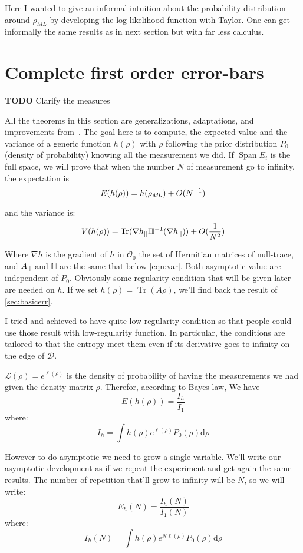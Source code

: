 \documentclass[10pt]{report}
\theoremstyle{plain}
\theoremstyle{definition}
\theoremstyle{remark}
\newcommand{\TODO}{\textbf{TODO}}
\newcommand{\dd}{\mathrm{d}}
\DeclareMathOperator{\Tr}{Tr}
\DeclareMathOperator{\Span}{Span}
\newcommand{\ml}{_{M\!L}}
\begin{document}
Here I wanted to give an informal intuition about the probability distribution
around $\rho\ml$ by developing the log-likelihood function with Taylor. One can
get informally the same results as in next section but with far less calculus.

\section{Complete first order error-bars}\label{sec:errbar}

\TODO{} Clarify the measures

All the theorems in this section are generalizations,
adaptations, and improvements from~\cite{SPRAL17}. The goal here is to compute,
the expected value and the variance of a generic function $h(\rho)$
with $\rho$ following the prior distribution $P_0$
(density of probability) knowing all the measurement
we did. If $\Span E_i$ is the full space,
we will prove that when the number $N$ of measurement go to infinity, the
expectation is
\[E(h(\rho)) = h(\rho\ml) + O(N\inv)\]

and the variance is:
\[V(h(\rho)) = \Tr(\nabla h\pr \mathbb H\inv(\nabla h\pr)) +O(\frac 1 {N^2})\]

Where $\nabla h$ is the gradient of $h$ in $\mathcal{O}_0$ the set of Hermitian
matrices of null-trace, and $A_{||}$ and $\mathbb H$ are the same that below
\cref{eqn:var}. Both asymptotic value are independent of $P_0$. Obviously some
regularity condition that will be given later are needed on $h$. If we set
$h(\rho) = \Tr(A\rho)$, we'll find back the result of \cref{sec:basicerr}.

I tried and achieved to have quite low regularity condition so that people could
use those result with low-regularity function. In particular, the conditions are
tailored to that the entropy meet them even if its derivative goes to infinity
on the edge of $\mathcal{D}$.

$\mathcal{L}(\rho) = e^{\ell(\rho)}$ is the density of probability of having
the measurements we had given the density matrix $\rho$. Therefor, according to
Bayes law, We have
\[E(h(\rho)) = \frac{I_h}{I_1}\]
where:
\[I_h = \int h(\rho) e^{\ell(\rho)} P_0(\rho) \dd \rho \]

However to do asymptotic we need to grow a single variable. We'll write our
asymptotic development as if we repeat the experiment and get again the same
results. The number of repetition that'll grow to infinity will be $N$, so we
will write:
\[E_h(N) = \frac{I_h(N)}{I_1(N)}\]
where:
\[I_h(N) = \int h(\rho) e^{N\ell(\rho)} P_0(\rho) \dd \rho \]
\end{document}
